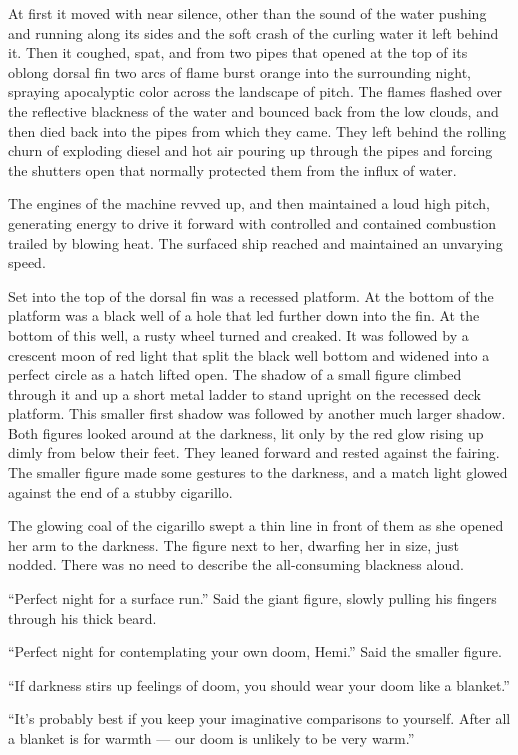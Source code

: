 \documentclass[]{scrbook}
\begin{document}
At first it moved with near silence, other than the sound of the water
pushing and running along its sides and the soft crash of the curling
water it left behind it. Then it coughed, spat, and from two pipes that
opened at the top of its oblong dorsal fin two arcs of flame burst
orange into the surrounding night, spraying apocalyptic color across the
landscape of pitch. The flames flashed over the reflective blackness of
the water and bounced back from the low clouds, and then died back into
the pipes from which they came. They left behind the rolling churn of
exploding diesel and hot air pouring up through the pipes and forcing
the shutters open that normally protected them from the influx of water.

The engines of the machine revved up, and then maintained a loud high
pitch, generating energy to drive it forward with controlled and
contained combustion trailed by blowing heat. The surfaced ship reached
and maintained an unvarying speed.

Set into the top of the dorsal fin was a recessed platform. At the
bottom of the platform was a black well of a hole that led further down
into the fin. At the bottom of this well, a rusty wheel turned and
creaked. It was followed by a crescent moon of red light that split the
black well bottom and widened into a perfect circle as a hatch lifted
open. The shadow of a small figure climbed through it and up a short
metal ladder to stand upright on the recessed deck platform. This
smaller first shadow was followed by another much larger shadow. Both
figures looked around at the darkness, lit only by the red glow rising
up dimly from below their feet. They leaned forward and rested against
the fairing. The smaller figure made some gestures to the darkness, and
a match light glowed against the end of a stubby cigarillo.

The glowing coal of the cigarillo swept a thin line in front of them as
she opened her arm to the darkness. The figure next to her, dwarfing her
in size, just nodded. There was no need to describe the all-consuming
blackness aloud.

``Perfect night for a surface run.'' Said the giant figure, slowly
pulling his fingers through his thick beard.

``Perfect night for contemplating your own doom, Hemi.'' Said the
smaller figure.

``If darkness stirs up feelings of doom, you should wear your doom like
a blanket.''

``It's probably best if you keep your imaginative comparisons to
yourself. After all a blanket is for warmth --- our doom is unlikely to
be very warm.''
\end{document}
